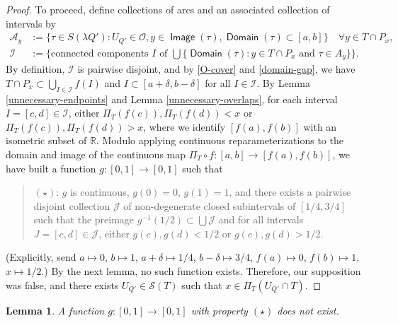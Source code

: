 \documentclass[12pt]{amsart}
\numberwithin{equation}{section}
\theoremstyle{plain}
\newtheorem{lemma}[theorem]{Lemma}
\theoremstyle{definition}
\def\RR{\mathbb{R}}
\newcommand{\Domain}{\mathop\mathsf{Domain}\nolimits}
\newcommand{\Image}{\mathop\mathsf{Image}\nolimits}
\numberwithin{figure}{section}
\begin{document}
\begin{proof}
To proceed, define collections of arcs and an associated collection of intervals by \begin{align}
\mathcal{A}_y&:=\{\tau\in S(\lambda Q'):U_{Q'}\in\mathcal{O}, y\in\Image(\tau), \Domain(\tau)\subset[a,b]\}\quad\forall y\in T\cap P_x,\\
\mathcal{I}&:=\{\text{connected components $I$ of }\bigcup\{\Domain(\tau): y\in T\cap P_x\text{ and }\tau\in A_y\}\}.\end{align} By definition, $\mathcal{I}$ is pairwise disjoint, and by \eqref{O-cover} and \eqref{domain-gap}, we have $T\cap P_x\subset \bigcup_{I\in\mathcal{I}} f(I)$ and $I\subset[a+\delta,b-\delta]$ for all $I\in\mathcal{I}$. By Lemma \ref{unnecessary-endpoints} and Lemma \ref{unnecessary-overlaps}, for each interval $I=[c,d]\in\mathcal{I}$, either $\Pi_T(f(c)),\Pi_T(f(d))<x$ or $\Pi_T(f(c)),\Pi_T(f(d))>x$, where we identify $[f(a),f(b)]$ with an isometric subset of $\RR$. Modulo applying continuous reparameterizations to the domain and image of the continuous map $\Pi_T\circ f:[a,b]\rightarrow[f(a),f(b)]$, we have built a function $g:[0,1]\rightarrow[0,1]$ such that \begin{quotation}$(\star)$: $g$ is continuous, $g(0)=0$, $g(1)=1$, and there exists a pairwise disjoint collection $\mathcal{J}$ of non-degenerate closed subintervals of $[1/4,3/4]$ such that the preimage $g^{-1}(1/2)\subset\bigcup\mathcal{J}$ and for all intervals $J=[c,d]\in\mathcal{J}$, either $g(c),g(d)<1/2$ or $g(c),g(d)>1/2$.\end{quotation} (Explicitly, send $a\mapsto 0$, $b\mapsto 1$, $a+\delta\mapsto 1/4$, $b-\delta\mapsto 3/4$, $f(a)\mapsto 0$, $f(b)\mapsto 1$, $x\mapsto 1/2$.) By the next lemma, no such function exists. Therefore, our supposition was false, and there exists $U_{Q'}\in \mathcal{S}(T)$ such that $x\in \Pi_T(U_{Q'}\cap T)$.\end{proof}

\begin{lemma} A function $g:[0,1]\rightarrow[0,1]$ with property $(\star)$ does not exist.\end{lemma}
\end{document}

